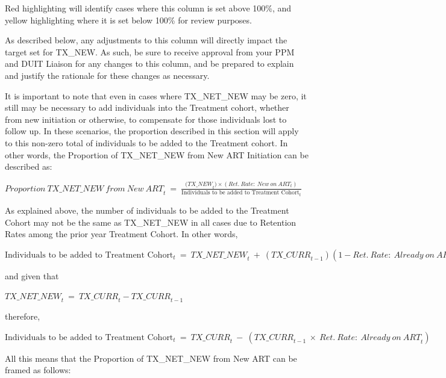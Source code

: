 \documentclass[
  openany]{book}
\begin{document}
Red highlighting will identify cases where this column is set above
100\%, and yellow highlighting where it is set below 100\% for review
purposes.

As described below, any adjustments to this column will directly impact
the target set for TX\_NEW. As such, be sure to receive approval from
your PPM and DUIT Liaison for any changes to this column, and be
prepared to explain and justify the rationale for these changes as
necessary.

It is important to note that even in cases where TX\_NET\_NEW may be zero,
it still may be necessary to add individuals into the Treatment cohort,
whether from new initiation or otherwise, to compensate for those
individuals lost to follow up. In these scenarios, the proportion
described in this section will apply to this non-zero total of
individuals to be added to the Treatment cohort. In other words, the
Proportion of TX\_NET\_NEW from New ART Initiation can be described as:

\begin{center} ${Proportion\ TX\_ NET\_ NEW\ from\ New\ ART}_{t}\  = \ \frac{{(TX\_ NEW}_{t}) \times ({Ret.\ Rate:\ New\ on\ ART}_{t})}{\text{Individuals\ to\ be\ added\ to\ Treatment\ Cohort}_{t}}$ \end{center}

As explained above, the number of individuals to be added to the
Treatment Cohort may not be the same as TX\_NET\_NEW in all cases due to
Retention Rates among the prior year Treatment Cohort. In other words,

\begin{center} $\text{Individuals\ to\ be\ added\ to\ Treatment\ Cohort}_{t}\  = \ {TX\_ NET\_ NEW}_{t}\  + \ ({TX\_ CURR}_{t - 1})(1 - {Ret.\ Rate:\ Already\ on\ ART}_{t})$ \end{center}

and given that

\begin{center} ${TX\_ NET\_ NEW}_{t}\  = \ {TX\_ CURR}_{t} - {TX\_ CURR}_{t - 1}$ \end{center}

therefore,

\begin{center} $\text{Individuals\ to\ be\ added\ to\ Treatment\ Cohort}_{t}\  = \ {TX\_ CURR}_{t}\  - \ ({TX\_ CURR}_{t - 1}\  \times \ {Ret.\ Rate:\ Already\ on\ ART}_{t})$ \end{center}

All this means that the Proportion of TX\_NET\_NEW from New ART can be
framed as follows:
\end{document}
